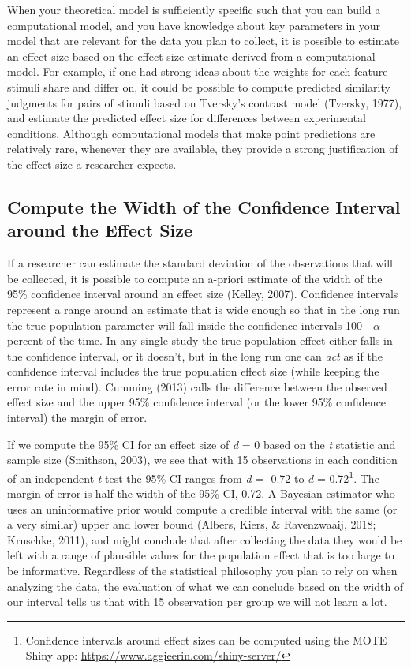 \documentclass[
  english,
  ,jou,floatsintext]{apa6}
\begin{document}
When your theoretical model is sufficiently specific such that you can build a computational model, and you have knowledge about key parameters in your model that are relevant for the data you plan to collect, it is possible to estimate an effect size based on the effect size estimate derived from a computational model. For example, if one had strong ideas about the weights for each feature stimuli share and differ on, it could be possible to compute predicted similarity judgments for pairs of stimuli based on Tversky's contrast model (Tversky, 1977), and estimate the predicted effect size for differences between experimental conditions. Although computational models that make point predictions are relatively rare, whenever they are available, they provide a strong justification of the effect size a researcher expects.

\hypertarget{compute-the-width-of-the-confidence-interval-around-the-effect-size}{%
\subsection{Compute the Width of the Confidence Interval around the Effect Size}\label{compute-the-width-of-the-confidence-interval-around-the-effect-size}}

If a researcher can estimate the standard deviation of the observations that will be collected, it is possible to compute an a-priori estimate of the width of the 95\% confidence interval around an effect size (Kelley, 2007). Confidence intervals represent a range around an estimate that is wide enough so that in the long run the true population parameter will fall inside the confidence intervals 100 - \(\alpha\) percent of the time. In any single study the true population effect either falls in the confidence interval, or it doesn't, but in the long run one can \emph{act} as if the confidence interval includes the true population effect size (while keeping the error rate in mind). Cumming (2013) calls the difference between the observed effect size and the upper 95\% confidence interval (or the lower 95\% confidence interval) the margin of error.

If we compute the 95\% CI for an effect size of \emph{d} = 0 based on the \emph{t} statistic and sample size (Smithson, 2003), we see that with 15 observations in each condition of an independent \emph{t} test the 95\% CI ranges from \emph{d} = -0.72 to \emph{d} = 0.72\footnote{Confidence intervals around effect sizes can be computed using the MOTE Shiny app: \url{https://www.aggieerin.com/shiny-server/}}. The margin of error is half the width of the 95\% CI, 0.72. A Bayesian estimator who uses an uninformative prior would compute a credible interval with the same (or a very similar) upper and lower bound (Albers, Kiers, \& Ravenzwaaij, 2018; Kruschke, 2011), and might conclude that after collecting the data they would be left with a range of plausible values for the population effect that is too large to be informative. Regardless of the statistical philosophy you plan to rely on when analyzing the data, the evaluation of what we can conclude based on the width of our interval tells us that with 15 observation per group we will not learn a lot.
\end{document}
